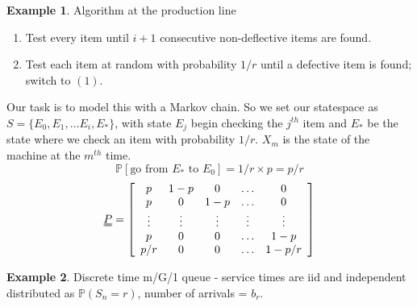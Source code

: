 \documentclass{article}
\theoremstyle{definition}
\newtheorem*{ex}{Example}
\begin{document}
\begin{ex}
Algorithm at the production line
\begin{enumerate}
\item
Test every item until $i+1$ consecutive non-deflective items are found.
\item
Test each item at random  with probability $1/r$ until a defective item is found; switch to $(1)$.
\end{enumerate}
Our task is to model this with a Markov chain. So we set our statespace as $S = \{E_0, E_1, \ldots E_i, E_{\ast} \}$, with state $E_j$ begin checking the $j^{th}$ item and $E_{\ast}$ be the state where we check an item with probability $1/r$. $X_m$ is the state of the machine at the $m^{th}$ time.
\[
\mathbb{P}[ \mbox{go from } E_{\ast} \mbox{ to } E_0 ] = 1/r \times p = p/r
\] 
\[
\uuline{P} = \left [ \begin{array}{ccccc} p & 1-p & 0 & \hdots & 0\\ p & 0 & 1 - p & \hdots & 0\\ \vdots & \vdots & \vdots & \vdots & \vdots\\ p & 0 & 0 & \hdots & 1 - p\\ p/r & 0 & 0 & \hdots & 1 - p/r \end{array} \right ]
\]
\end{ex}

\begin{ex} Discrete time m/G/1 queue - service times are iid and independent distributed as $\mathbb{P}(S_n = r)$, number of arrivals = $b_r$.
\end{ex}
\end{document}
